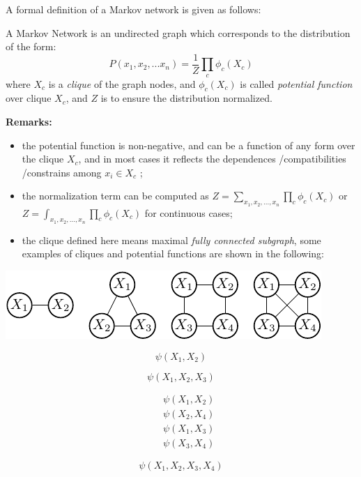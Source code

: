 A formal definition of a Markov network is given as follows: 
\begin{definition}
 A Markov Network is an undirected graph which corresponds to the distribution of the form:
 \begin{equation}
  P(x_1,x_2,...x_n)=\frac{1}{Z}\prod_{c}\phi_c(X_c)
  \label{equ:MN_factorization}
 \end{equation}
 where $X_c$ is a \emph{clique} of the graph nodes, and $\phi_c(X_c)$ is called \emph{potential function} over clique $X_c$, and $Z$ is to ensure the distribution normalized.
\end{definition}
\textbf{Remarks:}
\begin{itemize}
 \item the potential function is non-negative, and can be a function of any form over the clique $X_c$, and in most cases it reflects the dependences /compatibilities /constrains among $x_i\in X_c$ ;
 \item the normalization term can be computed as $Z=\sum_{x_1,x_2,\dots,x_n}\prod_{c}\phi_c(X_c)$ or $Z=\int_{x_1,x_2,\dots,x_n}\prod_{c}\phi_c(X_c)$ for continuous cases;
 \item the clique defined here means maximal \emph{fully connected subgraph}, some examples of cliques and potential functions are shown in the following: 
\end{itemize}
\includegraphics[width=\textwidth]{./Figures/clique}\newline
\begin{minipage}[c]{0.24\textwidth}
 \begin{equation*}
  \psi(X_1,X_2)
 \end{equation*}
\end{minipage}
\begin{minipage}[c]{0.24\textwidth}
 \begin{equation*}
  \psi(X_1,X_2,X_3)
 \end{equation*}
\end{minipage}
\begin{minipage}[c]{0.25\textwidth}
 \begin{equation*}
  \begin{array}{rcl}
   && \psi(X_1,X_2)\\
   && \psi(X_2,X_4)\\
   && \psi(X_1,X_3)\\
   && \psi(X_3,X_4)
  \end{array}
 \end{equation*}
\end{minipage}
\begin{minipage}[c]{0.24\textwidth}
 \begin{equation*}
 \psi(X_1,X_2,X_3,X_4)
 \end{equation*}
\end{minipage}

